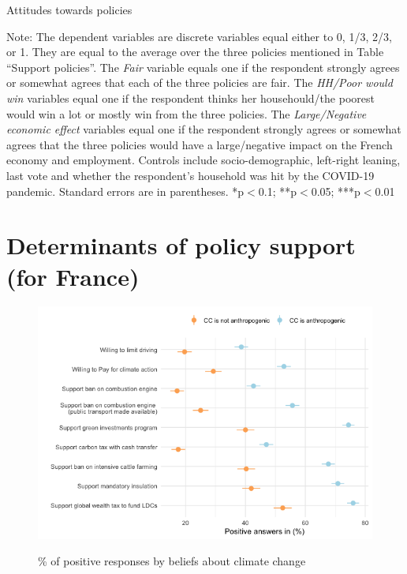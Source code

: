 	\begin{frame}{}%
	\begin{table}[h!]
	\caption{Attitudes towards policies}
	\begin{center}
	\scalebox{.7}{}
	\end{center}
		{\scriptsize Note: The dependent variables are discrete variables equal either to 0, 1/3, 2/3, or 1. They are equal to the average over the three policies mentioned in Table ``Support policies''. The \textit{Fair} variable equals one if the respondent strongly agrees or somewhat agrees that each of the three policies are fair. The \textit{HH/Poor would win} variables equal one if the respondent thinks her househould/the poorest would win a lot or mostly win from the three policies. The \textit{Large/Negative economic effect} variables equal one if the respondent strongly agrees or somewhat agrees that the three policies would have a large/negative impact on the French economy and employment. 
		\newline Controls include socio-demographic, left-right leaning, last vote and whether the respondent's household was hit by the COVID-19 pandemic. Standard errors are in parentheses. *p$<$0.1; **p$<$0.05; ***p$<$0.01}
	\end{table}
	\end{frame}

	
\section{Determinants of policy support (for France)} %

\begin{frame}{}%
	\begin{figure}[h!]
	\caption{\% of positive responses by beliefs about climate change} %
	\includegraphics[width=.7\paperwidth]{../figures/FR/positive_all_by_CC_anthropogenic_FR.png} \\
	\end{figure}
	\end{frame}
	
